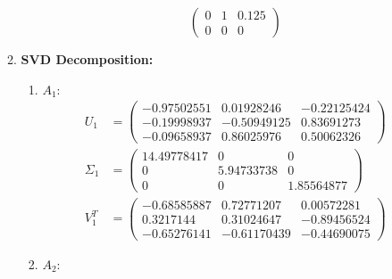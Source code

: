 \documentclass[conference,onecolumn]{IEEEtran}
\begin{document}
\begin{enumerate}[label=\arabic{enumi}.]
\begin{enumerate}
\begin{enumerate}
$$\begin{pmatrix}
                                      0 & 1 & 0.125 \\
                                      0 & 0 & 0
                                  \end{pmatrix}
                              $$
                    \end{enumerate}
              \item \textbf{SVD Decomposition:}
                    \begin{enumerate}
                        \item $A_1$:
                              \begin{align*}
                                  U_1      & =
                                  \begin{pmatrix}
                                      -0.97502551 & 0.01928246  & -0.22125424 \\
                                      -0.19998937 & -0.50949125 & 0.83691273  \\
                                      -0.09658937 & 0.86025976  & 0.50062326
                                  \end{pmatrix} \\
                                  \Sigma_1 & =
                                  \begin{pmatrix}
                                      14.49778417 & 0          & 0          \\
                                      0           & 5.94733738 & 0          \\
                                      0           & 0          & 1.85564877
                                  \end{pmatrix} \\
                                  V_1^T    & =
                                  \begin{pmatrix}
                                      -0.68585887 & 0.72771207  & 0.00572281  \\
                                      0.3217144   & 0.31024647  & -0.89456524 \\
                                      -0.65276141 & -0.61170439 & -0.44690075
                                  \end{pmatrix}
                              \end{align*}
                        \item $A_2$:
                              \begin{align*}

\end{align*}
\end{enumerate}
\end{enumerate}
\end{enumerate}
\end{document}
